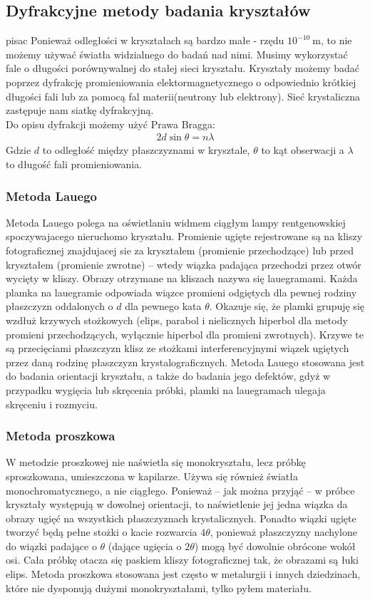 \documentclass[paper=a4, fontsize=12pt]{scrartcl}
\begin{document}
\subsection{Dyfrakcyjne metody badania kryształów}

pisac
Ponieważ odległości w kryształach są bardzo małe - rzędu $10^{-10}\:\mathrm{m}$, to nie możemy używać światła widzialnego do badań nad nimi. Musimy wykorzystać fale o długości porównywalnej do stałej sieci kryształu. Kryształy możemy badać poprzez dyfrakcję promieniowania elektormagnetycznego o odpowiednio krótkiej długości fali lub za pomocą fal materii(neutrony lub elektrony). Sieć krystaliczna zastępuje nam siatkę dyfrakcyjną.\\
Do opisu dyfrakcji możemy użyć Prawa Bragga:
\begin{align*}
2d\sin\theta=n\lambda
\end{align*}
Gdzie $d$ to odległość między płaszczyznami w krysztale, $\theta$ to kąt obserwacji a $\lambda$ to długość fali promieniowania.
\subsubsection{Metoda Lauego}
Metoda Lauego polega na oświetlaniu widmem ciągłym lampy rentgenowskiej spoczywajacego nieruchomo kryształu. Promienie ugięte rejestrowane są na kliszy
fotograficznej znajdujacej sie za kryształem (promienie przechodzące) lub przed kryształem (promienie zwrotne) – wtedy wiązka padająca przechodzi przez otwór wycięty w kliszy. Obrazy otrzymane na kliszach nazywa się lauegramami. Każda plamka na lauegramie odpowiada wiązce promieni odgiętych dla pewnej rodziny płaszczyzn oddalonych o $d$ dla pewnego kata $\theta$. Okazuje się, że plamki grupuję się wzdłuż krzywych
stożkowych (elips, parabol i nielicznych hiperbol dla metody promieni przechodzących, wyłącznie hiperbol dla promieni zwrotnych). Krzywe te są przecięciami płaszczyzn klisz ze stożkami interferencyjnymi wiązek ugiętych przez daną rodzinę płaszczyzn krystalograficznych. Metoda Lauego stosowana jest do badania orientacji kryształu, a także do badania
jego defektów, gdyż w przypadku wygięcia lub skręcenia próbki, plamki na lauegramach
ulegaja skręceniu i rozmyciu.
\subsubsection{Metoda proszkowa}
W metodzie proszkowej nie naświetla się monokryształu, lecz próbkę sproszkowana, umieszczona w kapilarze. Używa się również światła monochromatycznego, a nie ciągłego. Ponieważ – jak można przyjąć – w próbce kryształy występują w dowolnej orientacji, to naświetlenie jej jedna wiązka da obrazy ugięć na wszystkich płaszczyznach
krystalicznych. Ponadto wiązki ugięte tworzyć będą pełne stożki o kacie rozwarcia $4\theta$, ponieważ płaszczyzny nachylone do wiązki padające o $\theta$ (dające ugięcia o $2\theta$) mogą być dowolnie obrócone wokół osi. Cała próbkę otacza się paskiem kliszy fotograficznej tak, że obrazami są łuki elips. Metoda proszkowa stosowana jest często w metalurgii i innych dziedzinach, które nie dysponują dużymi monokryształami, tylko pyłem materiału.
\end{document}
